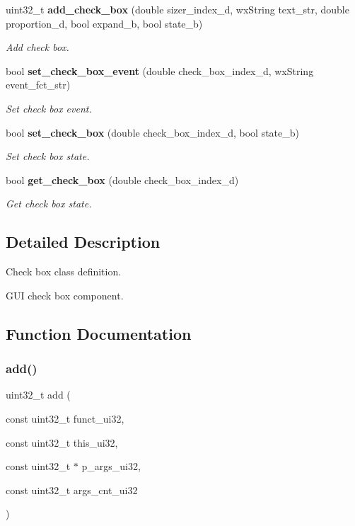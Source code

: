 \begin{DoxyCompactItemize}
uint32\+\_\+t \textbf{ add\+\_\+check\+\_\+box} (double sizer\+\_\+index\+\_\+d, wx\+String text\+\_\+str, double proportion\+\_\+d, bool expand\+\_\+b, bool state\+\_\+b)
\begin{DoxyCompactList}\small\item\em Add check box. \end{DoxyCompactList}\item 
bool \textbf{ set\+\_\+check\+\_\+box\+\_\+event} (double check\+\_\+box\+\_\+index\+\_\+d, wx\+String event\+\_\+fct\+\_\+str)
\begin{DoxyCompactList}\small\item\em Set check box event. \end{DoxyCompactList}\item 
bool \textbf{ set\+\_\+check\+\_\+box} (double check\+\_\+box\+\_\+index\+\_\+d, bool state\+\_\+b)
\begin{DoxyCompactList}\small\item\em Set check box state. \end{DoxyCompactList}\item 
bool \textbf{ get\+\_\+check\+\_\+box} (double check\+\_\+box\+\_\+index\+\_\+d)
\begin{DoxyCompactList}\small\item\em Get check box state. \end{DoxyCompactList}\end{DoxyCompactItemize}


\subsection{Detailed Description}
Check box class definition. 

G\+UI check box component.

\subsection{Function Documentation}
\mbox{\label{group___check__box_ga490542606fe12f142cd2b00cb1ecaefd}} 
\subsubsection{add()}
{\footnotesize\ttfamily uint32\+\_\+t add (\begin{DoxyParamCaption}\item[{const uint32\+\_\+t}]{funct\+\_\+ui32,  }\item[{const uint32\+\_\+t}]{this\+\_\+ui32,  }\item[{const uint32\+\_\+t $\ast$}]{p\+\_\+args\+\_\+ui32,  }\item[{const uint32\+\_\+t}]{args\+\_\+cnt\+\_\+ui32 }\end{DoxyParamCaption})\hspace{0.3cm}{\ttfamily [static]}}



